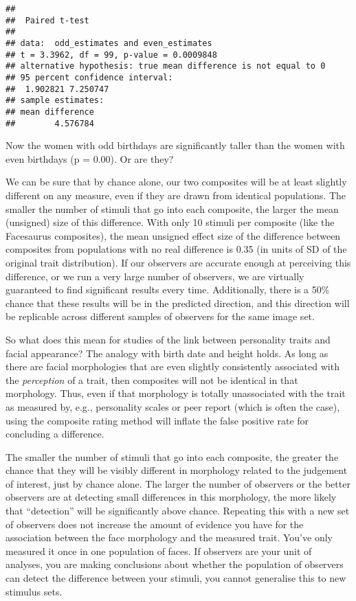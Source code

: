 \documentclass[
  doc,floatsintext]{apa6}
\begin{document}
\begin{verbatim}
## 
##  Paired t-test
## 
## data:  odd_estimates and even_estimates
## t = 3.3962, df = 99, p-value = 0.0009848
## alternative hypothesis: true mean difference is not equal to 0
## 95 percent confidence interval:
##  1.902821 7.250747
## sample estimates:
## mean difference 
##        4.576784
\end{verbatim}

Now the women with odd birthdays are significantly taller than the women with even birthdays (p = 0.00). Or are they?

We can be sure that by chance alone, our two composites will be at least slightly different on any measure, even if they are drawn from identical populations. The smaller the number of stimuli that go into each composite, the larger the mean (unsigned) size of this difference. With only 10 stimuli per composite (like the Facesaurus composites), the mean unsigned effect size of the difference between composites from populations with no real difference is 0.35 (in units of SD of the original trait distribution). If our observers are accurate enough at perceiving this difference, or we run a very large number of observers, we are virtually guaranteed to find significant results every time. Additionally, there is a 50\% chance that these results will be in the predicted direction, and this direction will be replicable across different samples of observers for the same image set.

So what does this mean for studies of the link between personality traits and facial appearance? The analogy with birth date and height holds. As long as there are facial morphologies that are even slightly consistently associated with the \emph{perception} of a trait, then composites will not be identical in that morphology. Thus, even if that morphology is totally unassociated with the trait as measured by, e.g., personality scales or peer report (which is often the case), using the composite rating method will inflate the false positive rate for concluding a difference.

The smaller the number of stimuli that go into each composite, the greater the chance that they will be visibly different in morphology related to the judgement of interest, just by chance alone. The larger the number of observers or the better observers are at detecting small differences in this morphology, the more likely that ``detection'' will be significantly above chance. Repeating this with a new set of observers does not increase the amount of evidence you have for the association between the face morphology and the measured trait. You've only measured it once in one population of faces. If observers are your unit of analyses, you are making conclusions about whether the population of observers can detect the difference between your stimuli, you cannot generalise this to new stimulus sets.
\end{document}
